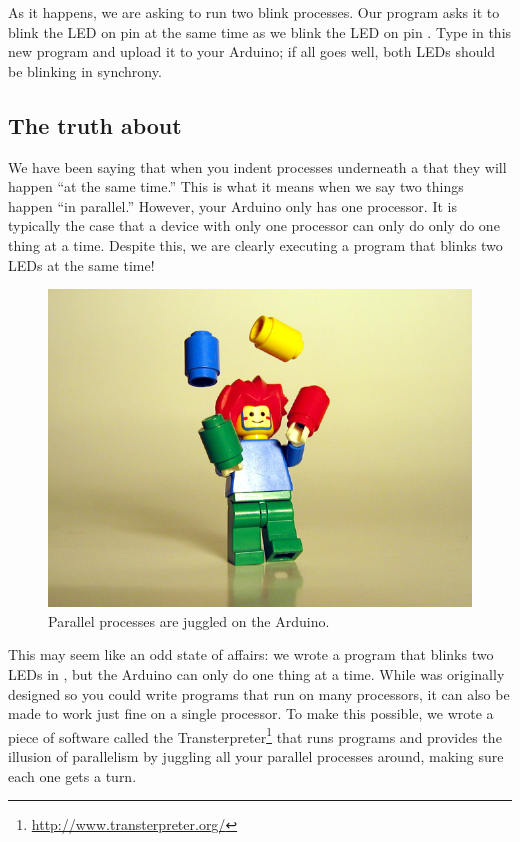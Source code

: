 	\newpage
	
As it happens, we are asking \plumbing to run two {\procname blink} processes. Our program asks it to blink the LED on pin \pintwelve at the same time as we blink the LED on pin \pineleven. Type in this new program and upload it to your Arduino; if all goes well, both LEDs should be blinking in synchrony.

\subsection{The truth about \PAR}


We have been saying that when you indent processes underneath a \PAR that they will happen ``at the same time.'' This is what it means when we say two things happen ``in parallel.'' However, your {\strong Arduino only has one processor}. It is typically the case that a device with only one processor can only do only do one thing at a time. Despite this, we are clearly executing a program that blinks two LEDs at the same time!

\newpage

\begin{figure}[ht]
  \begin{center}
    \includegraphics[width=0.8\linewidth]{images/juggling}
    \caption{Parallel processes are juggled on the Arduino.}
    \label{image:juggling}
  \end{center}
\end{figure}

This may seem like an odd state of affairs: we wrote a program that blinks two LEDs in \PARallel, but the Arduino can only do one thing at a time. While \occam was originally designed so you could write programs that run on many processors, it can also be made to work just fine on a single processor. To make this possible, we wrote a piece of software called the Transterpreter\footnote{\url{http://www.transterpreter.org/}} that runs \occam programs and provides the illusion of parallelism by juggling all your parallel processes around, making sure each one gets a turn. 

